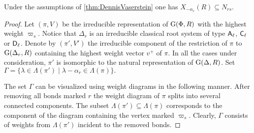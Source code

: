 \begin{lemma}\label{lemma:Stein_reduction}
Under the assumptions of \cref{thm:DennisVaserstein} one has $X_{-\alpha_r}(R) \subseteq N_{rs}.$
\end{lemma}
\begin{proof}
Let $(\pi, V)$ be the irreducible representation of $\operatorname{G}(\Phi, R)$ with the highest weight $\varpi_s$.
Notice that $\Delta_r$ is an irreducible classical root system of type $\mathsf{A}_\ell$, $\mathsf{C}_\ell$ or $\mathsf{D}_\ell$.
Denote by $(\pi', V')$ the irreducible component of the restriction of $\pi$ to $\operatorname{G}(\Delta_r, R)$ containing the highest weight vector $v^+$ of $\pi$.
In all the cases under consideration, $\pi'$ is isomorphic to the natural representation of $\operatorname{G}(\Delta, R)$.
Set $\Gamma = \{\lambda \in \Lambda(\pi') \mid \lambda - \alpha_r \in \Lambda(\pi) \}.$

The set $\Gamma$ can be visualized using weight diagrams in the following manner.
After removing all bonds marked $r$ the weight diagram of $\pi$ splits into several connected components.
The subset $\Lambda(\pi') \subseteq \Lambda(\pi)$ corresponds to the component of the diagram containing the vertex marked $\varpi_s$.
Clearly, $\Gamma$ consists of weights from $\Lambda(\pi')$ incident to the removed bonds.


\end{proof}
